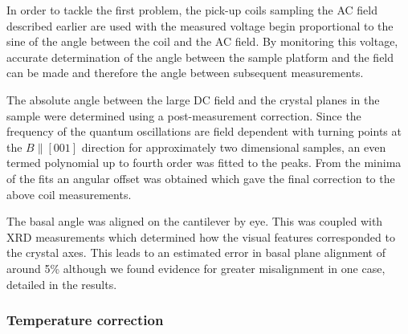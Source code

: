 In order to tackle the first problem, the pick-up coils sampling the AC field described earlier are used with the measured voltage begin proportional to the sine of the angle between the coil and the AC field. By monitoring this voltage, accurate determination of the angle between the sample platform and the field can be made and therefore the angle between subsequent measurements.

The absolute angle between the large DC field and the crystal planes in the sample were determined using a post-measurement correction. Since the frequency of the quantum oscillations are field dependent with turning points at the $B\parallel [001]$ direction for approximately two dimensional samples, an even termed polynomial up to fourth order was fitted to the peaks. From the minima of the fits an angular offset was obtained which gave the final correction to the above coil measurements.

The basal angle was aligned on the cantilever by eye. This was coupled with \ac{XRD} measurements which determined how the visual features corresponded to the crystal axes. This leads to an estimated error in basal plane alignment of around \unit{5}{\%} although we found evidence for greater misalignment in one case, detailed in the results.

\subsubsection{Temperature correction}
    \label{Sec:Exp:TemperatureCorrection}

